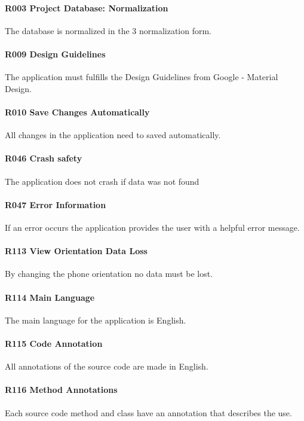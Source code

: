 \paragraph{R003 Project Database: Normalization}
The database is normalized in the 3 normalization form.
\paragraph{R009 Design Guidelines}
The application must fulfills the Design Guidelines from Google - Material Design.
\paragraph{R010 Save Changes Automatically}
All changes in the application need to saved automatically.
\paragraph{R046 Crash safety}
The application does not crash if data was not found
\paragraph{R047 Error Information}
If an error occurs the application provides the user with a helpful error message.
\paragraph{R113 View Orientation Data Loss}
By changing the phone orientation no data must be lost.
\paragraph{R114 Main Language}
The main language for the application is English.
\paragraph{R115 Code Annotation}
All annotations of the source code are made in English.
\paragraph{R116 Method Annotations}
Each source code method and class have an annotation that describes the use.